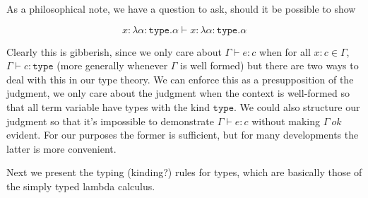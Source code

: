 \documentclass{amsart}
\newcommand{\type}{\ensuremath{\mathtt{type}}}
\begin{document}

As a philosophical note, we have a question to ask, should it be
possible to show

\[
  x : \lambda \alpha : \type. \alpha \vdash x : \lambda \alpha : \type. \alpha
\]

Clearly this is gibberish, since we only care about
$\Gamma \vdash e : c$ when for all $x : c \in \Gamma$,
$\Gamma \vdash c : \type$ (more generally whenever $\Gamma$ is well
formed) but there are two ways to deal with this in our type
theory. We can enforce this as a presupposition of the judgment, we
only care about the judgment when the context is well-formed so that
all term variable have types with the kind $\type$. We could also
structure our judgment so that it's impossible to demonstrate
$\Gamma \vdash e : c$ without making $\Gamma\ ok$ evident. For our purposes the
former is sufficient, but for many developments the
latter is more convenient.

Next we present the typing (kinding?) rules for types, which are basically those
of the simply typed lambda calculus.

\end{document}
